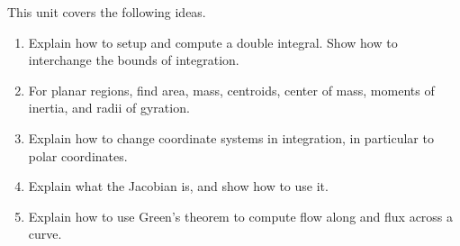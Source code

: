 \newcommand{\sageDoubleIntegralCheckerURL}{http://bmw.byuimath.com/dokuwiki/doku.php?id=double_integral_calculator}


\noindent 
This unit covers the following ideas.   
\begin{enumerate}
\item Explain how to setup and compute a double integral. Show how to interchange the bounds of integration.
\item For planar regions, find area, mass, centroids, center of mass, moments of inertia, and radii of gyration.
\item Explain how to change coordinate systems in integration, in particular to polar coordinates. 
\item Explain what the Jacobian is, and show how to use it.
\item Explain how to use Green's theorem to compute flow along and flux across a curve.
\end{enumerate}


